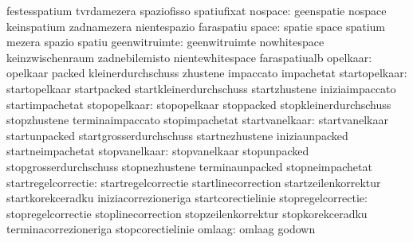                                   festesspatium                    tvrdamezera
                                  spaziofisso                      spatiufixat
                         nospace: geenspatie                       nospace
                                  keinspatium                      zadnamezera
                                  nientespazio                     faraspatiu
                           space: spatie                           space
                                  spatium                          mezera
                                  spazio                           spatiu
                   geenwitruimte: geenwitruimte                    nowhitespace
                                  keinzwischenraum                 zadnebilemisto
                                  nientewhitespace                 faraspatiualb
                        opelkaar: opelkaar                         packed
                                  kleinerdurchschuss               zhustene
                                  impaccato                        impachetat
                   startopelkaar: startopelkaar                    startpacked
                                  startkleinerdurchschuss          startzhustene
                                  iniziaimpaccato                  startimpachetat
                    stopopelkaar: stopopelkaar                     stoppacked
                                  stopkleinerdurchschuss           stopzhustene
                                  terminaimpaccato                 stopimpachetat
                  startvanelkaar: startvanelkaar                   startunpacked
                                  startgrosserdurchschuss          startnezhustene
                                  iniziaunpacked                   startneimpachetat
                   stopvanelkaar: stopvanelkaar                    stopunpacked
                                  stopgrosserdurchschuss           stopnezhustene
                                  terminaunpacked                  stopneimpachetat
             startregelcorrectie: startregelcorrectie              startlinecorrection
                                  startzeilenkorrektur             startkorekceradku
                                  iniziacorrezioneriga             startcorectielinie
              stopregelcorrectie: stopregelcorrectie               stoplinecorrection
                                  stopzeilenkorrektur              stopkorekceradku
                                  terminacorrezioneriga            stopcorectielinie
                          omlaag: omlaag                           godown
